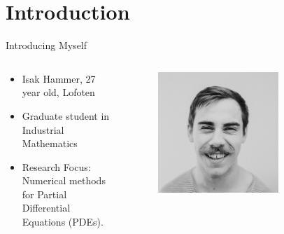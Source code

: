 \section{Introduction}


\begin{frame}{Introducing Myself}
    \begin{columns}
        \begin{column}{0.5\textwidth}
            \begin{itemize}
                \item Isak Hammer, 27 year old, Lofoten
                \item Graduate student in Industrial Mathematics
                \item Research Focus: Numerical methods for Partial Differential Equations (PDEs).
            \end{itemize}
        \end{column}

        \begin{column}{0.5\textwidth}
            \begin{figure}
                \centering
                \includegraphics[width=0.7\textwidth]{figures/isak.jpg}
            \end{figure}
        \end{column}
    \end{columns}
\end{frame}

